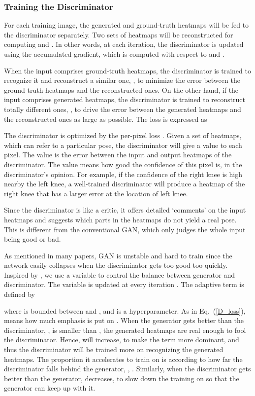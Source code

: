 \documentclass[10pt,twocolumn,letterpaper]{article}
\begin{document}
\subsubsection{Training the Discriminator}
For each training image, the generated and ground-truth heatmaps will be fed to the discriminator separately. Two sets of heatmaps will be reconstructed for computing  and . In other words, at each iteration, the discriminator is updated using the accumulated gradient, which is computed with respect to  and . 


When the input comprises ground-truth heatmaps, the discriminator is trained to recognize it and reconstruct a similar one, \ie, to minimize the error between the ground-truth heatmaps and the reconstructed ones. On the other hand, if the input comprises generated heatmaps, the discriminator is trained to reconstruct totally different ones, \ie, to drive the error between the generated heatmaps and the reconstructed ones as large as possible. The loss is expressed as 

The discriminator is optimized by the per-pixel loss . Given a set of heatmaps, which can refer to a particular pose, the discriminator will give a value to each pixel. The value is the error between the input and output heatmaps of the discriminator. The value means how good the confidence of this pixel is, in the discriminator's opinion. 
For example, if the confidence of the right knee is high nearby the left knee, a well-trained discriminator will produce a heatmap of the right knee that has a larger error at the location of left knee. 

Since the discriminator is like a critic, it offers detailed `comments' on the input heatmaps and suggests which parts in the heatmaps do not yield a real pose. This is different from the conventional GAN, which only judges the whole input being good or bad.  

As mentioned in many papers, GAN is unstable and hard to train since the network easily collapses when the discriminator gets too good too quickly. Inspired by \cite{BerthelotSM17}, we use a variable  to control the balance between generator and discriminator. The variable is updated at every iteration . The adaptive term  is defined by 

where  is bounded between  and , and  is a hyperparameter. As in Eq.~(\ref{D_loss}),  means how much emphasis is put on . When the generator gets better than the discriminator,  \ie,  is smaller than , the generated heatmaps are real enough to fool the discriminator. Hence,  will increase, to make the term   more dominant, and thus the discriminator will be trained more on recognizing the generated heatmaps. The proportion it accelerates to train on  is according to how far the discriminator falls behind the generator, \ie, . Similarly, when the discriminator gets better than the generator,  decreases, to slow down the training on  so that the generator can keep up with it.
\end{document}
